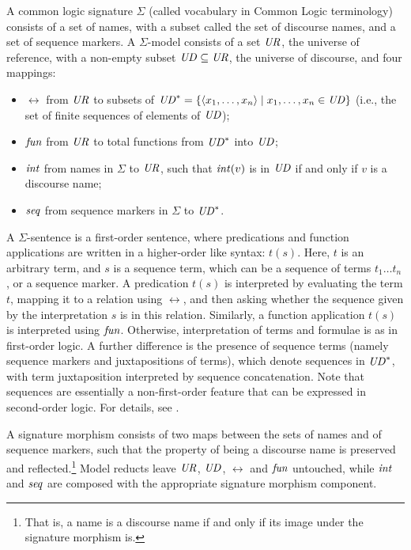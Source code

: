 \documentclass[10pt,fleqn,%
\ifpretendfinal
final%
\else
draft%
\fi,
]{scrreprt}
\begin{document}
\begin{definition}\label{CommonLogic}
A common logic signature
$\Sigma$ (called vocabulary in Common Logic terminology) consists of a
set of names, with a subset called the set of discourse names, and a
set of sequence markers. 
A $\Sigma$-model consists of a set $\mathit{UR}$,
the universe of reference, with a non-empty subset $\mathit{UD}\subseteq \mathit{UR}$,
the universe of discourse, and four mappings:
  \begin{itemize}
   \item $\rel$ from $\mathit{UR}$ to subsets of $\mathit{UD}^* = \{\langle x_1,\ldots,x_n \rangle \mid x_1,\ldots,x_n \in \mathit{UD}\}$ (i.e., the set of finite sequences of
elements of $\mathit{UD}$);
   \item $\mathit{fun}$ from $\mathit{UR}$ to total functions from $\mathit{UD}^*$ into $\mathit{UD}$;
   \item $\mathit{int}$ from names in $\Sigma$ to $\mathit{UR}$, such that
$\mathit{int}(v)$ is in $\mathit{UD}$ if and only if $v$ is a discourse name;
   \item $\mathit{seq}$ from sequence markers in $\Sigma$ to $\mathit{UD}^*$.
  \end{itemize}  A $\Sigma$-sentence is a first-order
sentence, where predications and function applications are written
in a higher-order like syntax: $t(s)$.
Here, $t$ is an arbitrary term, and $s$ is a sequence term, which can
be a sequence of terms $t_1\ldots t_n$, or a sequence marker.
A predication $t(s)$ is interpreted by evaluating the term $t$,
mapping it to a relation using $\rel$, and then asking whether the sequence
given by the interpretation $s$ is in this relation.  
Similarly, a function application $t(s)$ is interpreted using $\mathit{fun}$.
Otherwise, interpretation of terms and formulae is as in
first-order logic. 
A further
difference is the presence of sequence terms (namely sequence markers and
juxtapositions of terms), which denote sequences in $\mathit{UD}^*$, with term
juxtaposition interpreted by sequence concatenation.
Note that sequences are essentially a non-first-order feature that
can be expressed in second-order logic.
For details, see \cite{CommonLogic:oldfashioned}.

A \Clogic signature morphism 
consists of two maps between the sets of names and of sequence markers, such that the property of 
being a discourse name is preserved and reflected.\footnote{That is, a name is a discourse
name if and only if its image under the signature morphism is.}
  Model reducts leave $\mathit{UR}$, $\mathit{UD}$, 
$\rel$ and $\mathit{fun}$ untouched, while $\mathit{int}$ and $\mathit{seq}$ are composed with the appropriate
signature morphism component.
\end{definition}
%
\end{document}
